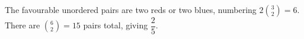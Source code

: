 The favourable unordered pairs are two reds or two blues, numbering $2\binom32=6$. There are $\binom62=15$ pairs total, giving $\boxed{\dfrac{2}{5}}$.
